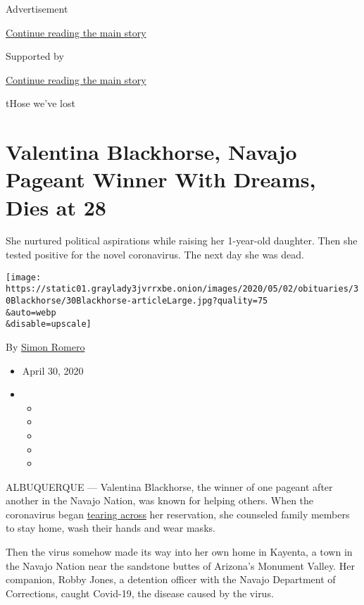 Advertisement

\protect\hyperlink{after-top}{Continue reading the main story}

Supported by

\protect\hyperlink{after-sponsor}{Continue reading the main story}

tHose we've lost

\hypertarget{valentina-blackhorse-navajo-pageant-winner-with-dreams-dies-at-28}{%
\section{Valentina Blackhorse, Navajo Pageant Winner With Dreams, Dies
at
28}\label{valentina-blackhorse-navajo-pageant-winner-with-dreams-dies-at-28}}

She nurtured political aspirations while raising her 1-year-old
daughter. Then she tested positive for the novel coronavirus. The next
day she was dead.

\texttt{[image: https://static01.graylady3jvrrxbe.onion/images/2020/05/02/obituaries/30Blackhorse/30Blackhorse-articleLarge.jpg?quality=75\\\&auto=webp\\\&disable=upscale]}

By \href{https://www.nytimes3xbfgragh.onion/by/simon-romero}{Simon
Romero}

\begin{itemize}
\item
  April 30, 2020
\item
  \begin{itemize}
  \item
  \item
  \item
  \item
  \item
  \end{itemize}
\end{itemize}

ALBUQUERQUE --- Valentina Blackhorse, the winner of one pageant after
another in the Navajo Nation, was known for helping others. When the
coronavirus began
\href{https://www.nytimes3xbfgragh.onion/2020/04/09/us/coronavirus-navajo-nation.html}{tearing
across} her reservation, she counseled family members to stay home, wash
their hands and wear masks.

Then the virus somehow made its way into her own home in Kayenta, a town
in the Navajo Nation near the sandstone buttes of Arizona's Monument
Valley. Her companion, Robby Jones, a detention officer with the Navajo
Department of Corrections, caught Covid-19, the disease caused by the
virus.

